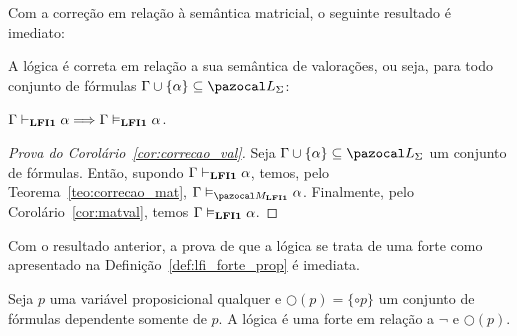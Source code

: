     Com a correção em relação à semântica matricial, o seguinte resultado é imediato:


    \begin{corolario}\label{cor:correcao_val}
        A lógica {\normalfont\lfium{}} é correta em relação a sua semântica de valorações, ou seja, para todo conjunto de fórmulas $\Gamma \cup \{\alpha\} \subseteq \ling{}$:

        \centering
        {\normalfont{} $\Gamma \vdash_{{\normalfont\textbf{LFI1}}{}} \alpha \Longrightarrow \Gamma \vDash_{{\normalfont\textbf{LFI1}}{}} \alpha$.}
    \end{corolario}

    \begin{proof}[Prova do Corolário~\ref{cor:correcao_val}]
        Seja $\Gamma \cup \{\alpha\} \subseteq \ling{}$ um conjunto de fórmulas. Então, supondo $\Gamma \vdash_{{\normalfont\textbf{LFI1}}{}} \alpha$, temos, pelo Teorema~\ref{teo:correcao_mat}, $\Gamma \conmat \alpha$. Finalmente, pelo Corolário~\ref{cor:matval}, temos $\Gamma \vDash_{{\normalfont\textbf{LFI1}}{}} \alpha$.
    \end{proof}

    Com o resultado anterior, a prova de que a lógica \lfium{} se trata de uma \lfi{} forte como apresentado na Definição~\ref{def:lfi_forte_prop} é imediata.

    \begin{corolario}\label{cor:lfi_forte}
        Seja $p$ uma variável proposicional qualquer e $\bigcirc(p) = \{\circ p\}$ um conjunto de fórmulas dependente somente de $p$. A lógica \lfium{} é uma \lfi{} forte em relação a $\neg$ e $\bigcirc(p)$.
    \end{corolario}

